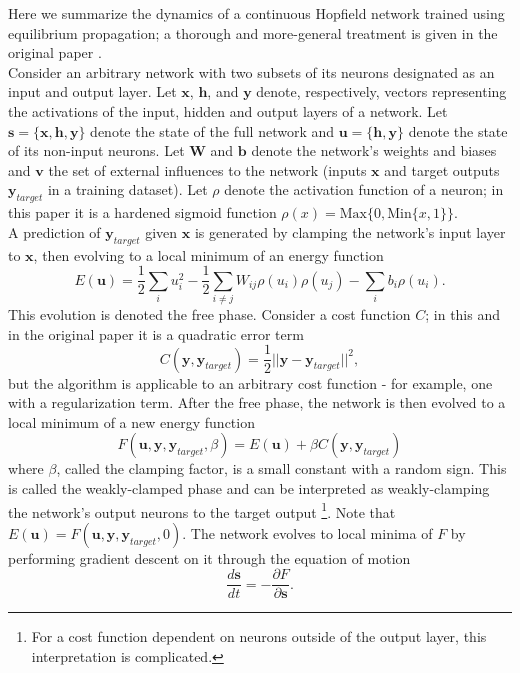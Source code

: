 \documentclass{article}
\newcommand{\mtx}[1]{\bm{#1}}
\newcommand{\npar}{\\\indent}
\begin{document}
Here we summarize the dynamics of a continuous Hopfield network trained using equilibrium propagation; a thorough and more-general treatment is given in the original paper \cite{scellier17}.
\npar
Consider an arbitrary network with two subsets of its neurons designated as an input and output layer. Let $\mtx{x}$, $\mtx{h}$, and $\mtx{y}$ denote, respectively, vectors representing the activations of the input, hidden and output layers of a network. Let $\mtx{s}=\{\mtx{x},\mtx{h},\mtx{y}\}$ denote the state of the full network and $\mtx{u}=\{\mtx{h},\mtx{y}\}$ denote the state of its non-input neurons. Let $\mtx{W}$ and $\mtx{b}$ denote the network's weights and biases and $\mtx{v}$ the set of external influences to the network (inputs $\mtx{x}$ and target outputs $\mtx{y}_{target}$ in a training dataset). Let $\rho$ denote the activation function of a neuron; in this paper it is a hardened sigmoid function $\rho(x)=\text{Max}\{0, \text{Min}\{x, 1\}\}$.
\npar
A prediction of $\mtx{y}_{target}$ given $\mtx{x}$ is generated by clamping the network's input layer to $\mtx{x}$, then evolving to a local minimum of an energy function
\begin{equation}
E(\mtx{u})=\frac{1}{2}\sum_iu_i^2-\frac{1}{2}\sum_{i\neq j}W_{ij}\rho(u_i)\rho(u_j)-\sum_ib_i\rho(u_i).
\end{equation}
This evolution is denoted the free phase. Consider a cost function $C$; in this and in the original paper it is a quadratic error term
\begin{equation}
C(\mtx{y},\mtx{y}_{target})=\frac{1}{2}||\mtx{y}-\mtx{y}_{target}||^2,
\end{equation}
but the algorithm is applicable to an arbitrary cost function - for example, one with a regularization term. After the free phase, the network is then evolved to a local minimum of a new energy function
\begin{equation}
F(\mtx{u},\mtx{y},\mtx{y}_{target}, \beta)=E(\mtx{u})+\beta C(\mtx{y},\mtx{y}_{target})
\end{equation}
where $\beta$, called the clamping factor, is a small constant with a random sign. This is called the weakly-clamped phase and can be interpreted as weakly-clamping the network's output neurons to the target output \footnote{For a cost function dependent on neurons outside of the output layer, this interpretation is complicated.}. Note that $E(\mtx{u})=F(\mtx{u},\mtx{y},\mtx{y}_{target},0)$. The network evolves to local minima of $F$ by performing gradient descent on it through the equation of motion
\begin{equation}
\label{eqn:dynamics}
\frac{d\mtx{s}}{dt}=-\frac{\partial F}{\partial \mtx{s}}.
\end{equation}
\end{document}
